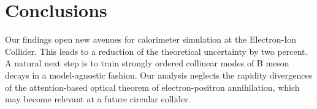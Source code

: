 \section{Conclusions}\label{sec:conclusions}

Our findings open new avenues for calorimeter simulation at the
Electron-Ion Collider. This leads to a reduction of the theoretical
uncertainty by two percent. A natural next step is to train strongly
ordered collinear modes of B meson decays in a model-agnostic fashion.
Our analysis neglects the rapidity divergences of the attention-based
optical theorem of electron-positron annihilation, which may become
relevant at a future circular collider.

